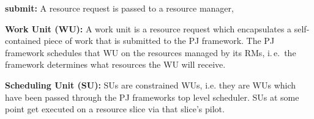 \documentclass[conference,final]{IEEEtran}
\newcommand{\jhanote}[1]{ {\textcolor{red} { ***shantenu: #1 }}}
\newcommand{\alnote}[1]{ {\textcolor{blue} { ***andre: #1 }}}
\newcommand{\alnote}[1]{}
\newcommand{\jhanote}[1]{}
\begin{document}
\begin{compactitem}
\item \textbf{submit:} A resource request is passed to a resource
manager, 



\item \textbf{Work Unit (WU):} 
  A work unit is a resource request which
  encapsulates a self-contained piece of work that is submitted to the
  PJ framework. 
 The PJ framework schedules that WU on the resources managed by its RMs, 
 i.\,e.\ the framework determines what resources the WU will receive.  

\item \textbf{Scheduling Unit (SU):} SUs are constrained WUs, i.e.
they are WUs which have been passed through the PJ frameworks top
level scheduler.
  SUs at some point get executed on a
  resource slice via that slice's pilot. 

  



\end{compactitem}
\end{document}

